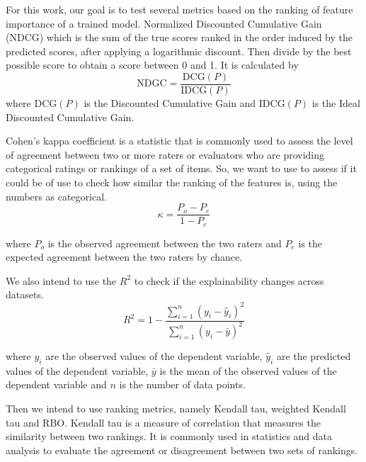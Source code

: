 For this work, our goal is to test several metrics based on the ranking of feature importance of a trained model. Normalized Discounted Cumulative Gain (NDCG) \cite{wangTheoreticalAnalysisNDCG} which is the sum of the true scores ranked in the order induced by the predicted scores, after applying a logarithmic discount. Then divide by the best possible score to obtain a score between 0 and 1. It is calculated by
\[
\text{{NDGC}} = \frac{{\text{{DCG}}(P)}}{{\text{{IDCG}}(P)}}
\]
where $\text{{DCG}}(P)$ is the Discounted Cumulative Gain and $\text{{IDCG}}(P)$ is the Ideal Discounted Cumulative Gain. 

Cohen's kappa coefficient \cite{doi:10.1177/001316446002000104}  is a statistic that is commonly used to assess the level of agreement between two or more raters or evaluators who are providing categorical ratings or rankings of a set of items. So, we want to use to assess if it could be of use to check how similar the ranking of the features is, using the numbers as categorical.
\[
\kappa = \frac{{P_o - P_e}}{{1 - P_e}}
\]

where \(P_o\) is the observed agreement between the two raters and \(P_e\) is the expected agreement between the two raters by chance.

We also intend to use the $R^2$ to check if the explainability changes across datasets.
\[
R^2 = 1 - \frac{{\sum_{i=1}^n (y_i - \hat{y}_i)^2}}{{\sum_{i=1}^n (y_i - \bar{y})^2}}
\]

where \(y_i\) are the observed values of the dependent variable, \(\hat{y}_i\) are the predicted values of the dependent variable, \(\bar{y}\) is the mean of the observed values of the dependent variable and \(n\) is the number of data points.

Then we intend to use ranking metrics, namely Kendall tau, weighted Kendall tau and RBO.
Kendall tau is a measure of correlation that measures the similarity between two rankings. It is commonly used in statistics and data analysis to evaluate the agreement or disagreement between two sets of rankings.

